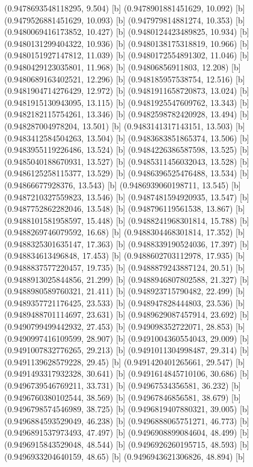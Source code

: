 {{{(0.9478693548118295, 9.504) [b] 
(0.9478901881451629, 10.092) [b] 
(0.9479526881451629, 10.093) [b] 
(0.947979814881274, 10.353) [b] 
(0.9480069416173852, 10.427) [b] 
(0.9480124423489825, 10.934) [b] 
(0.9480131299404322, 10.936) [b] 
(0.9480138175318819, 10.966) [b] 
(0.9480151927147812, 11.039) [b] 
(0.9480172554891302, 11.046) [b] 
(0.9480429123035801, 11.968) [b] 
(0.94806856911803, 12.208) [b] 
(0.9480689163402521, 12.296) [b] 
(0.948185957538754, 12.516) [b] 
(0.9481904714276429, 12.972) [b] 
(0.9481911658720873, 13.024) [b] 
(0.9481915130943095, 13.115) [b] 
(0.9481925547609762, 13.343) [b] 
(0.9482182115754261, 13.346) [b] 
(0.9482598782420928, 13.494) [b] 
(0.948287004978204, 13.501) [b] 
(0.9483141317143151, 13.503) [b] 
(0.9483412584504263, 13.504) [b] 
(0.9483683851865374, 13.506) [b] 
(0.9483955119226486, 13.524) [b] 
(0.9484226386587598, 13.525) [b] 
(0.9485040188670931, 13.527) [b] 
(0.9485311456032043, 13.528) [b] 
(0.9486125258115377, 13.529) [b] 
(0.9486396525476488, 13.534) [b] 
(0.94866677928376, 13.543) [b] 
(0.9486939060198711, 13.545) [b] 
(0.9487210327559823, 13.546) [b] 
(0.9487481594920935, 13.547) [b] 
(0.9487752862282046, 13.548) [b] 
(0.948796119561538, 13.867) [b] 
(0.9488101581958597, 15.448) [b] 
(0.9488241968301814, 15.788) [b] 
(0.9488269746079592, 16.68) [b] 
(0.9488304468301814, 17.352) [b] 
(0.9488325301635147, 17.363) [b] 
(0.9488339190524036, 17.397) [b] 
(0.948834613496848, 17.453) [b] 
(0.9488602703112978, 17.935) [b] 
(0.9488837577220457, 19.735) [b] 
(0.9488879243887124, 20.51) [b] 
(0.9488913025844856, 21.299) [b] 
(0.9488946807802588, 21.327) [b] 
(0.9488980589760321, 21.411) [b] 
(0.948923715790482, 22.499) [b] 
(0.9489357721176425, 23.533) [b] 
(0.948947828444803, 23.536) [b] 
(0.9489488701114697, 23.631) [b] 
(0.9489629087457914, 23.692) [b] 
(0.9490799499442932, 27.453) [b] 
(0.949098352722071, 28.853) [b] 
(0.9490997416109599, 28.907) [b] 
(0.9491004360554043, 29.009) [b] 
(0.9491007832776265, 29.213) [b] 
(0.9491011304998487, 29.314) [b] 
(0.9491139628579228, 29.45) [b] 
(0.9491420401265661, 29.547) [b] 
(0.9491493317932328, 30.641) [b] 
(0.9491614845710106, 30.686) [b] 
(0.9496739546769211, 33.731) [b] 
(0.94967534356581, 36.232) [b] 
(0.9496760380102544, 38.569) [b] 
(0.94967846856581, 38.679) [b] 
(0.9496798574546989, 38.725) [b] 
(0.9496819407880321, 39.005) [b] 
(0.9496884593529049, 46.238) [b] 
(0.9496888065751271, 46.773) [b] 
(0.9496891537973493, 47.497) [b] 
(0.9496908899084604, 48.499) [b] 
(0.9496915843529048, 48.544) [b] 
(0.9496926260195715, 48.593) [b] 
(0.9496933204640159, 48.65) [b] 
(0.9496943621306826, 48.894) [b] 
}}}
